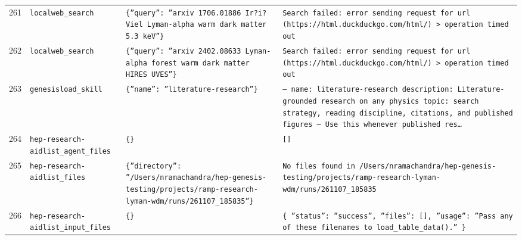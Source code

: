 \documentclass[11pt,a4paper]{article}
\begin{document}
\begin{longtable}{@{}p{}p{}p{}p{}@{}}
261 & \texttt{local}\newline\texttt{web\_\allowbreak{}search} & \texttt{\{''query'':\allowbreak{} ''arxiv 1706.01886 Ir?i? Viel Lyman-alpha warm dark matter 5.3 keV''\}\allowbreak{}} & \texttt{Search failed:\allowbreak{} error sending request for url (https:\allowbreak{}/\allowbreak{}/\allowbreak{}html.duckduckgo.com/\allowbreak{}html/\allowbreak{})\allowbreak{} \textgreater{}\allowbreak{} operation timed out} \\
262 & \texttt{local}\newline\texttt{web\_\allowbreak{}search} & \texttt{\{''query'':\allowbreak{} ''arxiv 2402.08633 Lyman-alpha forest warm dark matter HIRES UVES''\}\allowbreak{}} & \texttt{Search failed:\allowbreak{} error sending request for url (https:\allowbreak{}/\allowbreak{}/\allowbreak{}html.duckduckgo.com/\allowbreak{}html/\allowbreak{})\allowbreak{} \textgreater{}\allowbreak{} operation timed out} \\
263 & \texttt{genesis}\newline\texttt{load\_\allowbreak{}skill} & \texttt{\{''name'':\allowbreak{} ''literature-research''\}\allowbreak{}} & \texttt{--- name:\allowbreak{} literature-research description:\allowbreak{} Literature-grounded research on any physics topic:\allowbreak{} search strategy,\allowbreak{} reading discipline,\allowbreak{} citations,\allowbreak{} and published figures ---  Use this whenever published res\ldots{}\allowbreak{}} \\
264 & \texttt{hep-research-aid}\newline\texttt{list\_\allowbreak{}agent\_\allowbreak{}files} & \texttt{\{\}\allowbreak{}} & \texttt{[]\allowbreak{}} \\
265 & \texttt{hep-research-aid}\newline\texttt{list\_\allowbreak{}files} & \texttt{\{''directory'':\allowbreak{} ''/\allowbreak{}Users/\allowbreak{}nramachandra/\allowbreak{}hep-genesis-testing/\allowbreak{}projects/\allowbreak{}ramp-research-lyman-wdm/\allowbreak{}runs/\allowbreak{}261107\_\allowbreak{}185835''\}\allowbreak{}} & \texttt{No files found in /\allowbreak{}Users/\allowbreak{}nramachandra/\allowbreak{}hep-genesis-testing/\allowbreak{}projects/\allowbreak{}ramp-research-lyman-wdm/\allowbreak{}runs/\allowbreak{}261107\_\allowbreak{}185835} \\
266 & \texttt{hep-research-aid}\newline\texttt{list\_\allowbreak{}input\_\allowbreak{}files} & \texttt{\{\}\allowbreak{}} & \texttt{\{   ''status'':\allowbreak{} ''success'',\allowbreak{}   ''files'':\allowbreak{} []\allowbreak{},\allowbreak{}   ''usage'':\allowbreak{} ''Pass any of these filenames to load\_\allowbreak{}table\_\allowbreak{}data()\allowbreak{}.'' \}\allowbreak{}} \\

\end{longtable}
\end{document}
